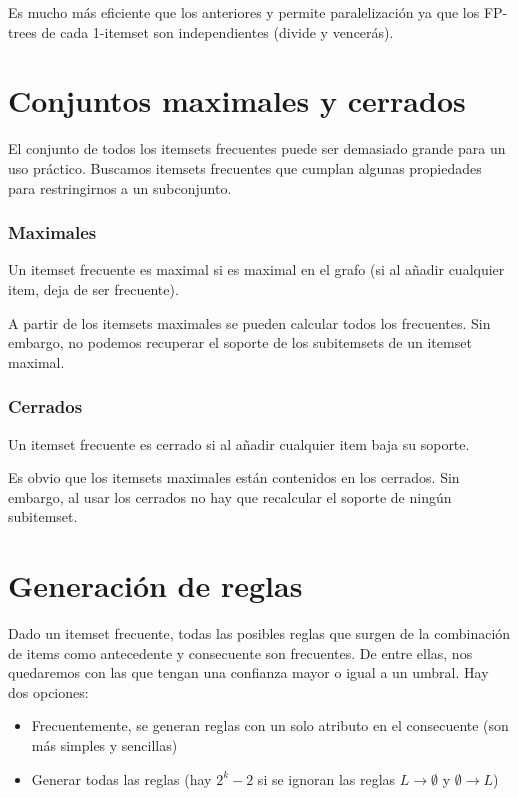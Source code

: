\documentclass[a4paper,11pt,spanish]{report}
\let\stdsection\section
\let\stdsub\subsection
\let\stdsubsub\subsubsection
\renewcommand{\chapter}{\stdsection}
\renewcommand{\section}{\stdsub}
\renewcommand{\subsection}{\stdsubsub}
\begin{document}
Es mucho más eficiente que los anteriores y permite paralelización ya que los FP-trees de cada 1-itemset son independientes (divide y vencerás).

\chapter{Conjuntos maximales y cerrados}
\label{sec-3-4}

El conjunto de todos los itemsets frecuentes puede ser demasiado grande para un uso práctico. Buscamos itemsets frecuentes que cumplan algunas propiedades para restringirnos a un subconjunto.

\subsection*{Maximales}
\label{sec-3-4-0-1}

Un itemset frecuente es maximal si es maximal en el grafo (si al añadir cualquier item, deja de ser frecuente).

A partir de los itemsets maximales se pueden calcular todos los frecuentes. Sin embargo, no podemos recuperar el soporte de los subitemsets de un itemset maximal.

\subsection*{Cerrados}
\label{sec-3-4-0-2}

Un itemset frecuente es cerrado si al añadir cualquier item baja su soporte.

Es obvio que los itemsets maximales están contenidos en los cerrados. Sin embargo, al usar los cerrados no hay que recalcular el soporte de ningún subitemset.

\chapter{Generación de reglas}
\label{sec-3-5}

Dado un itemset frecuente, todas las posibles reglas que surgen de la combinación de items como antecedente y consecuente son frecuentes. De entre ellas, nos quedaremos con las que tengan una confianza mayor o igual a un umbral. Hay dos opciones:
\begin{itemize}
\item Frecuentemente, se generan reglas con un solo atributo en el consecuente (son más simples y sencillas)
\item Generar todas las reglas (hay $2^k-2$ si se ignoran las reglas $L\rightarrow \emptyset$ y $\emptyset\rightarrow L$)
\end{itemize}
\end{document}

